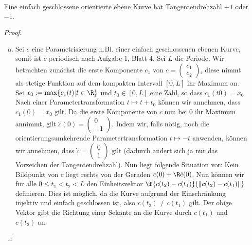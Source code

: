 \documentclass{mycourse}
\begin{document}
\begin{st}[Umlaufsatz]
\label{4.8}
Eine einfach geschlossene orientierte ebene Kurve hat Tangentendrehzahl $+1$ oder $-1$.

\begin{proof}
\begin{enumerate}[a)]
	\item
		Sei $c$ eine Parametrisierung n.Bl. einer einfach geschlossenen ebenen Kurve, somit ist $c$ periodisch nach Aufgabe 1, Blatt 4. Sei $L$ die Periode. Wir betrachten zunächst die erste Komponente $c_1$ von $c = \begin{pmatrix} c_1 \\ c_2 \end{pmatrix}$, diese nimmt als stetige Funktion auf dem kompakten Intervall $[0, L]$ ihr Maximum an. Sei $x_0 := \max \{ c_1(t) | t \in \R \}$ und $t_0 \in [0, L]$ eine Zahl, so dass $c_1(t0) = x_0$. Nach einer Parametertransformation $t \mapsto t + t_0$ können wir annehmen, dass $c_1(0) = x_0$ gilt. Da die erste Komponente von $c$ nun bei $0$ ihr Maximum annimmt, gilt $\dot c(0) = \begin{pmatrix} 0 \\ \pm 1 \end{pmatrix}$. Indem wir, falls nötig, noch die orientierungsumkehrende Parametertransformation $t \mapsto -t$ anwenden, können wir annehmen, dass $\dot c = \begin{pmatrix} 0 \\ 1 \end{pmatrix}$ gilt (dadurch ändert sich ja nur das Vorzeichen der Tangentendrehzahl). Nun liegt folgende Situation vor: Kein Bildpunkt von $c$ liegt rechts von der Geraden $c(0) + \R \dot c(0)$. Nun können wir für alle $0 \leq t_1 < t_2 < L$ den Einheitsvektor $\f{c(t_2) - c(t_1)}{\| c(t_2) - c(t_1) \|}$ definieren. Dies ist möglich, da die Kurve aufgrund der Einschränkung injektiv und einfach geschlossen ist, also $c(t_2) \neq c(t_1)$ gilt. Der obige Vektor gibt die Richtung einer Sekante an die Kurve durch $c(t_1)$ und $c(t_2)$ an.


\end{enumerate}
\end{proof}
\end{st}
\end{document}
